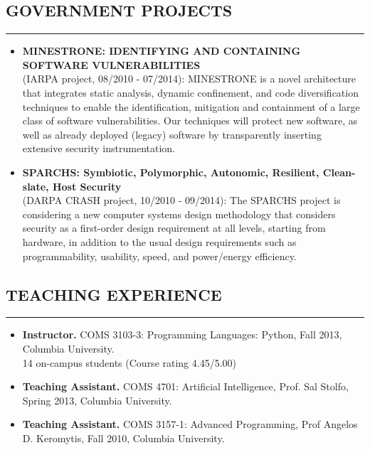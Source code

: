 \documentclass[10pt,a4]{article}
\begin{document}
\begin{small}
\subsection*{GOVERNMENT PROJECTS}
\hrule
\vspace{0.1cm}
\begin{itemize}
   \item[]
   {\bf MINESTRONE: IDENTIFYING AND CONTAINING SOFTWARE VULNERABILITIES} \\
   (IARPA project, 08/2010 - 07/2014): MINESTRONE is a novel architecture that
   integrates static analysis, dynamic confinement, and code diversification
   techniques to enable the identification, mitigation and containment of a
   large class of software vulnerabilities. Our techniques will protect new
   software, as well as already deployed (legacy) software by transparently
   inserting extensive security instrumentation. \\

   \item[]
   {\bf SPARCHS: Symbiotic, Polymorphic, Autonomic, Resilient, Clean-slate, Host
     Security}\\ 
   (DARPA CRASH project, 10/2010 - 09/2014): The SPARCHS project is considering
   a new computer systems design methodology that considers security as a
   first-order design requirement at all levels, starting from hardware, in
   addition to the usual design requirements such as programmability,
   usability, speed, and power/energy efficiency.  \end{itemize}

\subsection*{TEACHING EXPERIENCE}
\hrule
\vspace{0.2cm}

\begin{itemize}

\item {\bf Instructor.} COMS 3103-3: Programming Languages: Python, Fall 2013,
  Columbia University.\\
  14 on-campus students (Course rating 4.45/5.00)

\item {\bf Teaching Assistant.} COMS 4701: Artificial Intelligence, Prof. Sal
  Stolfo, Spring 2013, Columbia University.

\item {\bf Teaching Assistant.} COMS 3157-1: Advanced Programming, Prof Angelos
  D. Keromytis, Fall 2010, Columbia University.
\end{itemize}



\end{small}
\end{document}
